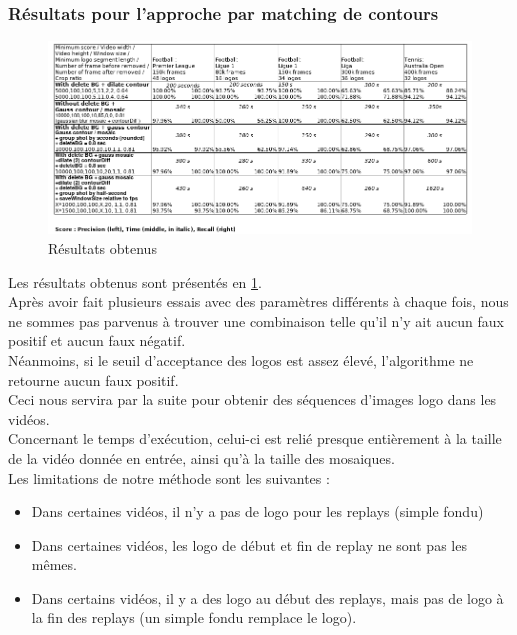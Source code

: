 \documentclass[11pt]{article}
\begin{document}
\subsubsection{Résultats pour l'approche par matching de contours}
\label{sec:orga0b201c}
\begin{figure}[htbp]
\centering
\includegraphics[width=17cm]{res_match_contour.png}
\caption{Résultats obtenus \label{res-match-contour}}
\end{figure}
Les résultats obtenus sont présentés en \ref{res-match-contour}.\\

Après avoir fait plusieurs essais avec des paramètres différents à chaque fois, nous ne sommes pas parvenus à trouver une combinaison telle qu'il n'y ait aucun faux positif et aucun faux négatif.\\
Néanmoins, si le seuil d'acceptance des logos est assez élevé, l'algorithme ne retourne aucun faux positif.\\
Ceci nous servira par la suite pour obtenir des séquences d'images logo dans les vidéos.\\

Concernant le temps d’exécution, celui-ci est relié presque entièrement à la taille de la vidéo donnée en entrée, ainsi qu’à la taille des mosaiques.\\

Les limitations de notre méthode sont les suivantes :\\
\begin{itemize}
\item Dans certaines vidéos, il n’y a pas de logo pour les replays (simple fondu)\\
\item Dans certaines vidéos, les logo de début et fin de replay ne sont pas les mêmes.\\
\item Dans certains vidéos, il y a des logo au début des replays, mais pas de logo à la fin des replays (un simple fondu remplace le logo).\\
\end{itemize}
\end{document}
